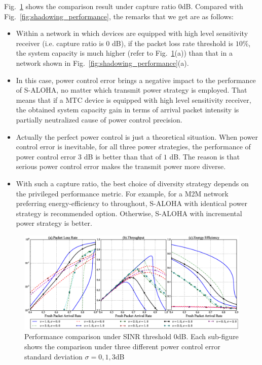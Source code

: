Fig.~\ref{fig:shadowing_performance_0} shows the comparison result under capture ratio $0$dB. Compared with Fig.~\ref{fig:shadowing_performance}, the remarks that we get are as follows:
\begin{itemize}[leftmargin=*, noitemsep]
	\item Within a network in which devices are equipped with high level sensitivity receiver (i.e. capture ratio is $0$ dB), if the packet loss rate threshold is $10\%$, the system capacity is much higher (refer to Fig.~\ref{fig:shadowing_performance_0}(a)) than that in a network shown in Fig.~\ref{fig:shadowing_performance}(a).
	\item In this case, power control error brings a negative impact to the performance of S-ALOHA, no matter which transmit power strategy is employed. That means that if a MTC device is equipped with high level sensitivity receiver, the obtained system capacity gain in terms of arrival packet intensity is 
	partially neutralized cause of power control precision.
	\item Actually the perfect power control is just a theoretical situation. When power control error is inevitable, for all three power strategies, the performance of power control error $3$ dB is better than that of $1$ dB. The reason is that serious power control error makes the transmit power more diverse. 
	\item With such a capture ratio, the best choice of diversity strategy depends on the privileged performance metric. For example, for a M2M network preferring energy-efficiency to throughout, S-ALOHA with identical power strategy is recommended option. Otherwise, S-ALOHA with incremental power strategy is better. 
\end{itemize}
\begin{figure}[!th]
	\centering
	\includegraphics[width=1.0\linewidth]{Chapter4/Figures/shadowing_performance_case_0.0.eps}
	\caption{Performance comparison under SINR threshold $0$dB. Each sub-figure shows the comparison under three different power control error standard deviation $\sigma = 0, 1, 3$dB}
	\label{fig:shadowing_performance_0}
\end{figure}

